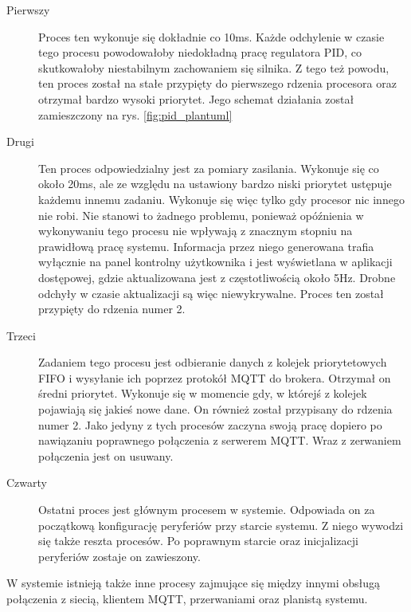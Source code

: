             \begin{description}
                \item [Pierwszy] Proces ten wykonuje się dokładnie co 10ms. Każde odchylenie w czasie tego procesu powodowałoby niedokładną pracę regulatora PID, co skutkowałoby niestabilnym zachowaniem się silnika. Z tego też powodu, ten proces został na stałe przypięty do pierwszego rdzenia procesora oraz otrzymał bardzo wysoki priorytet. Jego schemat działania został zamieszczony na rys. \ref{fig:pid_plantuml} 
                
                \item [Drugi] Ten proces odpowiedzialny jest za pomiary zasilania. Wykonuje się co około 20ms, ale ze względu na ustawiony bardzo niski priorytet ustępuje każdemu innemu zadaniu. Wykonuje się więc tylko gdy procesor nic innego nie robi. Nie stanowi to żadnego problemu, ponieważ opóźnienia w wykonywaniu tego procesu nie wpływają z znacznym stopniu na prawidłową pracę systemu. Informacja przez niego generowana trafia wyłącznie na panel kontrolny użytkownika i jest wyświetlana w aplikacji dostępowej, gdzie aktualizowana jest z częstotliwością około 5Hz. Drobne odchyły w czasie aktualizacji są więc niewykrywalne. Proces ten został przypięty do rdzenia numer 2.
                
                \item [Trzeci] Zadaniem tego procesu jest odbieranie danych z kolejek priorytetowych FIFO i wysyłanie ich poprzez protokół MQTT do brokera. Otrzymał on średni priorytet. Wykonuje się w momencie gdy, w którejś z kolejek pojawiają się jakieś nowe dane. On również został przypisany do rdzenia numer 2. Jako jedyny z tych procesów zaczyna swoją pracę dopiero po nawiązaniu poprawnego połączenia z serwerem MQTT. Wraz z zerwaniem połączenia jest on usuwany.
                
                \item [Czwarty] Ostatni proces jest głównym procesem w systemie. Odpowiada on za początkową konfigurację peryferiów przy starcie systemu. Z niego wywodzi się także reszta procesów. Po poprawnym starcie oraz inicjalizacji peryferiów zostaje on zawieszony.
            \end{description}
            
            W systemie istnieją także inne procesy zajmujące się między innymi obsługą połączenia z siecią, klientem MQTT, przerwaniami oraz planistą systemu. 
            

